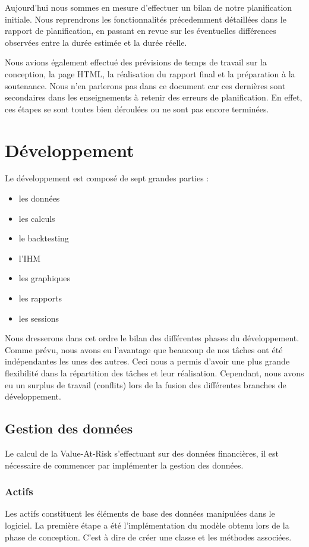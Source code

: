 \documentclass[a4paper]{report}
\begin{document}
Aujourd'hui nous sommes en mesure d'effectuer un bilan de notre planification initiale.
Nous reprendrons les fonctionnalités précedemment détaillées dans le rapport de planification, en passant en revue sur les éventuelles différences observées entre la durée estimée et la durée réelle.

Nous avions également effectué des prévisions de temps de travail sur la conception, la page HTML, la réalisation du rapport final et la préparation à la soutenance.
Nous n'en parlerons pas dans ce document car ces dernières sont secondaires dans les enseignements à retenir des erreurs de planification.
En effet, ces étapes se sont toutes bien déroulées ou ne sont pas encore terminées.


\chapter{Développement}
Le développement est composé de sept grandes parties :
\begin{itemize}
  \item les données
  \item les calculs
  \item le backtesting
  \item l'IHM
  \item les graphiques
  \item les rapports
  \item les sessions
\end{itemize}

Nous dresserons dans cet ordre le bilan des différentes phases du développement.
Comme prévu, nous avons eu l'avantage que beaucoup de nos tâches ont été indépendantes les unes des autres.
Ceci nous a permis d'avoir une plus grande flexibilité dans la répartition des tâches et leur réalisation.
Cependant, nous avons eu un surplus de travail (conflits) lors de la fusion des différentes branches de développement.

\section{Gestion des données}
Le calcul de la Value-At-Risk s'effectuant sur des données financières, il est nécessaire de commencer par implémenter la gestion des données.

\subsection{Actifs}
Les actifs constituent les éléments de base des données manipulées dans le logiciel.
La première étape a été l'implémentation du modèle obtenu lors de la phase de conception.
C'est à dire de créer une classe et les méthodes associées.
\end{document}
